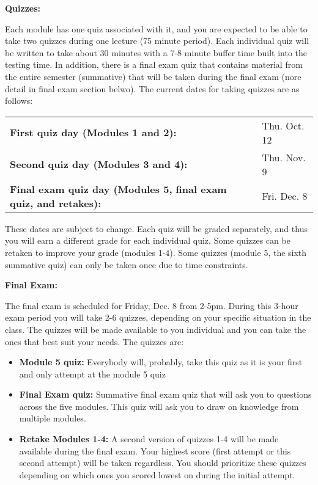 \documentclass[12pt]{article}
\begin{document}
\textbf{Quizzes:} 

Each module has one quiz associated with it, and you are expected to be able to take two quizzes during one lecture (75 minute period). Each individual quiz will be written to take about 30 minutes with a 7-8 minute buffer time built into the testing time. In addition, there is a final exam quiz that contains material from the entire semester (summative) that will be taken during the final exam (nore detail in final exam section belwo). The current dates for taking quizzes are as follows:

\begin{tabular}{ll}
\textbf{First quiz day (Modules 1 and 2):} & Thu. Oct. 12 \\
\textbf{Second quiz day (Modules 3 and 4):} & Thu. Nov. 9 \\
\textbf{Final exam quiz day (Modules 5, final exam quiz, and retakes):} & Fri. Dec. 8 \\
\end{tabular}

These dates are subject to change. Each quiz will be graded separately, and thus you will earn a different grade for each individual quiz. Some quizzes can be retaken to improve your grade (modules 1-4). Some quizzes (module 5, the sixth summative quiz) can only be taken once due to time constraints.

\textbf{Final Exam:} 

The final exam is scheduled for Friday, Dec. 8 from 2-5pm. During this 3-hour exam period you will take 2-6 quizzes, depending on your specific situation in the class. The quizzes will be made available to you individual and you can take the ones that best suit your needs. The quizzes are:

\begin{itemize}
\item  \textbf{Module 5 quiz:} Everybody will, probably, take this quiz as it is your first and only attempt at the module 5 quiz
\item \textbf{Final Exam quiz:} Summative final exam quiz that will ask you to questions across the five modules. This quiz will ask you to draw on knowledge from multiple modules.
\item \textbf{Retake Modules 1-4:} A second version of quizzes 1-4 will be made available during the final exam. Your highest score (first attempt or this second attempt) will be taken regardless. You should prioritize these quizzes depending on which ones you scored lowest on during the initial attempt.
\end{itemize}
\end{document}
